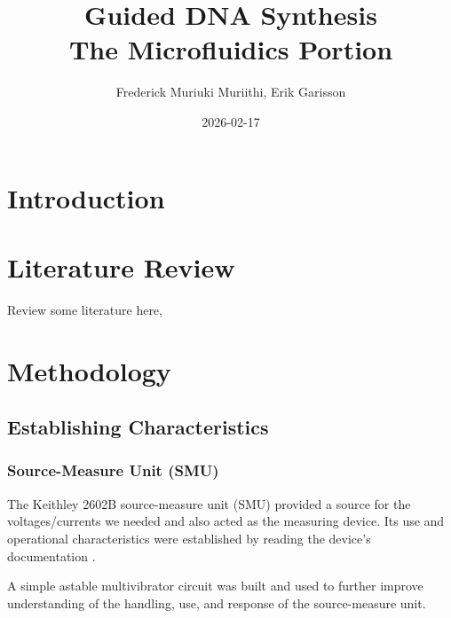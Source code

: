\documentclass[]{article}
\begin{document}
\title{Guided DNA Synthesis\\
  \small{The Microfluidics Portion}}
\author{Frederick Muriuki Muriithi, Erik Garisson}
\date{2026-02-17} %
\maketitle


\begin{abstract}
\end{abstract}

\tableofcontents



\section{Introduction}

\section{Literature Review}

Review some literature here, \textcite{xu2022719} \textcite{khan20211335}

\section{Methodology}

\subsection{Establishing Characteristics}

\subsubsection{Source-Measure Unit (SMU)}

The Keithley 2602B source-measure unit (SMU) provided a source for the voltages/currents we needed and also acted as the measuring device. Its use and operational characteristics were established by reading the device's documentation \textcite{tektronix-2600B-dtsht} \textcite{tektronix-2600B-usrmn} \textcite{tektronix-2600B-refmn} \textcite{tektronix-2600B-qsg}.

A simple astable multivibrator circuit was built and used to further improve understanding of the handling, use, and response of the source-measure unit.
\end{document}
